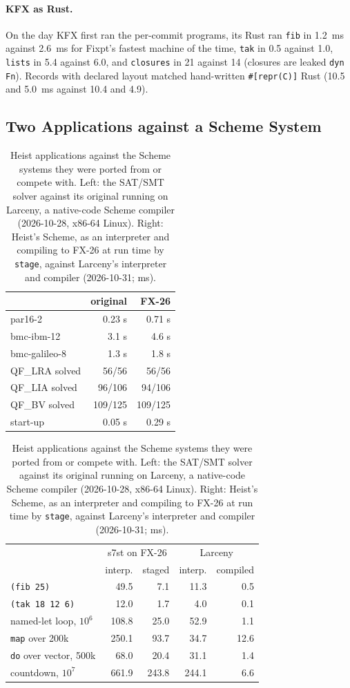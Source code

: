 \documentclass[acmsmall,screen,review]{acmart}
\newcommand{\cd}[1]{\texttt{#1}}
\newcommand{\fx}{FX-26}
\begin{document}
\paragraph{KFX as Rust.} On the day KFX first ran the per-commit
programs, its Rust ran \cd{fib} in 1.2~ms against 2.6~ms for Fixpt's
fastest machine of the time, \cd{tak} in 0.5 against 1.0, \cd{lists}
in 5.4 against 6.0, and \cd{closures} in 21 against 14 (closures are
leaked \cd{dyn Fn}). Records with declared layout matched hand-written
\cd{\#[repr(C)]} Rust (10.5 and 5.0~ms against 10.4 and 4.9).

\subsection{Two Applications against a Scheme System}
\label{sec:apps}

\begin{table}[t]
\caption{Heist applications against the Scheme systems they were
ported from or compete with. Left: the SAT/SMT solver against its
original running on Larceny, a native-code Scheme compiler (2026-10-28,
x86-64 Linux). Right: Heist's Scheme, as an interpreter and compiling
to \fx{} at run time by \cd{stage},
against Larceny's interpreter and compiler (2026-10-31; ms).}
\label{tab:apps}
\small
\begin{minipage}[t]{0.40\linewidth}
\begin{tabular}{@{}lrr@{}}
\toprule
 & original & \fx\\
\midrule
par16-2 & 0.23 s & 0.71 s\\
bmc-ibm-12 & 3.1 s & 4.6 s\\
bmc-galileo-8 & 1.3 s & 1.8 s\\
QF\_LRA solved & 56/56 & 56/56\\
QF\_LIA solved & 96/106 & 94/106\\
QF\_BV solved & 109/125 & 109/125\\
start-up & 0.05 s & 0.29 s\\
\bottomrule
\end{tabular}
\end{minipage}\hfill
\begin{minipage}[t]{0.58\linewidth}
\begin{tabular}{@{}lrrrr@{}}
\toprule
 & \multicolumn{2}{c}{s7st on \fx} & \multicolumn{2}{c}{Larceny}\\
  & interp. & staged & interp. & compiled\\
\midrule
\cd{(fib 25)} & 49.5 & 7.1 & 11.3 & 0.5\\
\cd{(tak 18 12 6)} & 12.0 & 1.7 & 4.0 & 0.1\\
named-let loop, $10^6$ & 108.8 & 25.0 & 52.9 & 1.1\\
\cd{map} over 200k & 250.1 & 93.7 & 34.7 & 12.6\\
\cd{do} over vector, 500k & 68.0 & 20.4 & 31.1 & 1.4\\
countdown, $10^7$ & 661.9 & 243.8 & 244.1 & 6.6\\
\bottomrule
\end{tabular}
\end{minipage}
\end{table}
\end{document}
